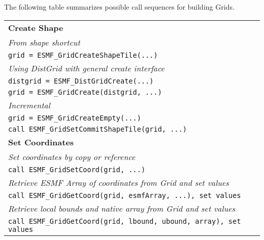 The following table summarizes possible call sequences
for building Grids.

\begin{tabular}{|l|}
\hline
{\bf Create Shape} \\
{\it From shape shortcut} \\
{\tt grid = ESMF\_GridCreateShapeTile(...)} \\
{\it Using DistGrid with general create interface} \\
{\tt distgrid = ESMF\_DistGridCreate(...)} \\
{\tt grid = ESMF\_GridCreate(distgrid, ...)} \\
{\it Incremental} \\
{\tt grid = ESMF\_GridCreateEmpty(...)} \\
{\tt call ESMF\_GridSetCommitShapeTile(grid, ...)} \\ \hline
{\bf Set Coordinates} \\
{\it Set coordinates by copy or reference} \\
{\tt call ESMF\_GridSetCoord(grid, ...)} \\
{\it Retrieve ESMF Array of coordinates from Grid and set values} \\
{\tt call ESMF\_GridGetCoord(grid, esmfArray, ...), set values} \\
{\it Retrieve local bounds and native array from Grid and set values} \\
{\tt call ESMF\_GridGetCoord(grid, lbound, ubound, array), set values} \\ \hline
\end{tabular}

